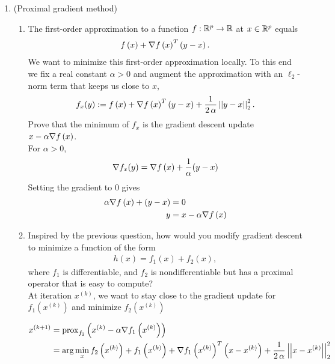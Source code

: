 \documentclass[12pt,twoside]{article}
\begin{document}
\begin{enumerate}
 \newpage
  \item (Proximal gradient method)   
 \begin{enumerate}
 \item The first-order approximation to a function $f:\mathbb{R}^{p}\rightarrow \mathbb{R}$ at $x \in \mathbb{R}^{p}$ equals
 \begin{align}
f\left( x \right) + \nabla f\left( x \right)^T\left( y-x \right). 
\end{align}
We want to minimize this first-order approximation locally. To this end we fix a real constant $\alpha >0$ and augment the approximation with an $\ell_2$-norm term that keeps us close to $x$,
 \begin{align}
f_{x}(y) :=f\left( x \right) + \nabla f\left( x \right)^T\left( y-x \right) +  \frac{1}{2 \, \alpha }\left|\left| y-x \right|\right| _{2}^2.
\end{align}
 Prove that the minimum of $f_{x}$ is the gradient descent update $x- \alpha \nabla f\left( x \right)$.\\
 For $\alpha > 0$,
 \begin{align*}
 	\nabla f_{x}(y) &= \nabla f\left( x \right) +   \frac{1}{\alpha } (y - x) \\
 \end{align*} 
 Setting the gradient to $0$ gives
 \begin{align*}
 	\alpha \nabla f\left( x \right) + (y - x)  &= 0\\
	y &= x - \alpha \nabla f\left( x \right) \\
 \end{align*} 
 
\item 
Inspired by the previous question, how would you modify gradient descent to minimize a function of the form
\begin{align}
h(x) = f_1(x) + f_2(x),
\end{align}
where $f_1$ is differentiable, and $f_2$ is nondifferentiable but has a proximal operator that is easy to compute?\\
At iteration $x^{(k)}$, we want to stay close to the gradient update for $f_1(x^{(k)})$ and minimize $f_2(x^{(k)})$

\begin{align*}
   x^{(k+1)}  	&= 	\operatorname{prox}_{f_2}\left( x^{(k)} - \alpha \nabla f_1\left( x^{(k)} \right) \right) \\
			&=   \arg \min_{x}  f_2\left( x^{(k)} \right) + f_1\left( x^{(k)} \right) + \nabla f_1\left( x^{(k)} \right)^T\left( x-x^{(k)} \right) +  \frac{1}{2 \, \alpha }\left|\left| x-x^{(k)} \right|\right| _{2}^2 \\
\end{align*}


\end{enumerate}
\end{enumerate}
\end{document}
